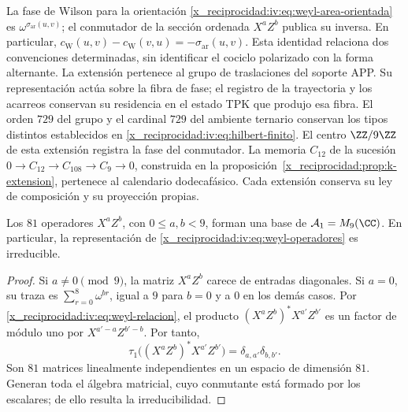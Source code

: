 La fase de Wilson para la orientación
\eqref{x_reciprocidad:iv:eq:weyl-area-orientada} es
\(\omega^{\sigma_{\mathrm{ar}}(u,v)}\); el conmutador de la
sección ordenada \(X^aZ^b\) publica su inversa. En particular,
\(c_{\mathrm W}(u,v)-c_{\mathrm W}(v,u)
=-\sigma_{\mathrm{ar}}(u,v)\).
Esta identidad relaciona dos convenciones determinadas, sin identificar
el cociclo polarizado con la forma alternante. La extensión pertenece
al grupo de traslaciones del soporte APP. Su representación actúa sobre
la fibra de fase; el registro de la trayectoria y los acarreos conservan
su residencia en el estado TPK que produjo esa fibra. El orden \(729\)
del grupo y el cardinal \(729\) del ambiente ternario conservan los
tipos distintos establecidos en \eqref{x_reciprocidad:iv:eq:hilbert-finito}.
El centro \(\ZZ/9\ZZ\) de esta extensión registra la fase
del conmutador. La memoria \(C_{12}\) de la sucesión
\(0\to C_{12}\to C_{108}\to C_9\to0\), construida en la
proposición~\ref{x_reciprocidad:prop:k-extension}, pertenece al calendario
dodecafásico. Cada extensión conserva su ley de composición y
su proyección propias.

\begin{proposition}
\label{x_reciprocidad:iv:prop:weyl-completo}
Los \(81\) operadores \(X^aZ^b\), con \(0\leq a,b<9\), forman
una base de \(\mathcal A_1=M_9(\CC)\). En particular, la
representación de \eqref{x_reciprocidad:iv:eq:weyl-operadores} es irreducible.
\end{proposition}
\begin{proof}
Si \(a\neq0\pmod9\), la matriz \(X^aZ^b\) carece de entradas
diagonales. Si \(a=0\), su traza es
\(\sum_{r=0}^8\omega^{br}\), igual a \(9\) para \(b=0\) y a
\(0\) en los demás casos. Por \eqref{x_reciprocidad:iv:eq:weyl-relacion}, el
producto \((X^aZ^b)^*X^{a'}Z^{b'}\) es un factor de módulo uno
por \(X^{a'-a}Z^{b'-b}\). Por tanto,
\[
 \tau_1\bigl((X^aZ^b)^*X^{a'}Z^{b'}\bigr)
 =\delta_{a,a'}\delta_{b,b'}.
\]
Son \(81\) matrices linealmente independientes en un espacio de
dimensión \(81\). Generan toda el álgebra matricial, cuyo conmutante
está formado por los escalares; de ello resulta la irreducibilidad.
\end{proof}

